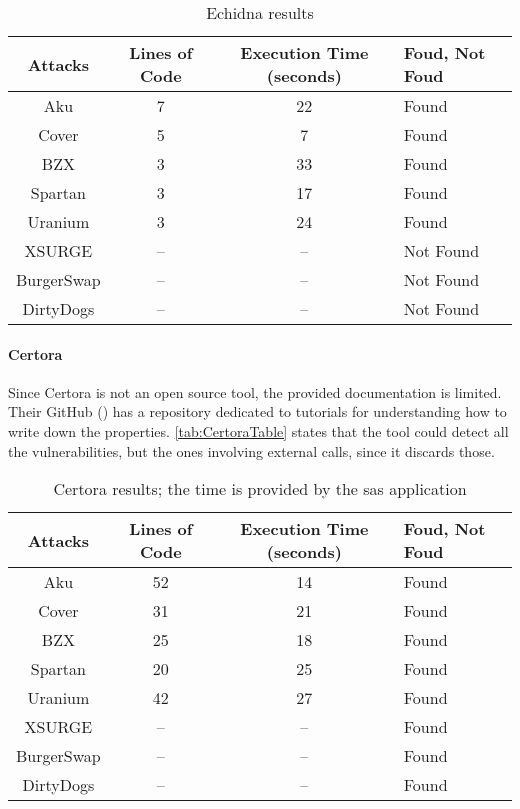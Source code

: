 \begin{center}
    \begin{table*}    
        \caption{Echidna results}
        \label{tab:EchidnaTable}
        \begin{tabular}{cccl}
        \toprule
            Attacks & Lines of Code & Execution Time (seconds) & Foud, Not Foud\\
            \midrule
            Aku & 7 & 22 & Found\\ 
            Cover & 5 & 7 & Found\\ 
            BZX & 3 & 33 & Found \\ 
            Spartan & 3 & 17 & Found  \\ 
            Uranium & 3 & 24 & Found \\ 
            XSURGE & -- & -- & Not Found \\  
            BurgerSwap &  -- & -- & Not Found \\ 
            DirtyDogs &  -- & -- & Not Found \\
        \bottomrule
        \end{tabular}
    \end{table*}
\end{center}

\paragraph{Certora} Since Certora is not an open source tool, the provided documentation is limited. 
Their GitHub (\cite{CertoraGitHub}) has a repository dedicated to tutorials for understanding how to write down the properties. 
\autoref{tab:CertoraTable} states that the tool could detect all the vulnerabilities, 
but the ones involving external calls, since it discards those.

\begin{center}
    \begin{table*}
        \caption{Certora results; the time is provided by the sas application}
            \label{tab:CertoraTable}
            \begin{tabular}{cccl}
            \toprule
                Attacks & Lines of Code & Execution Time (seconds) & Foud, Not Foud\\
                \midrule
                Aku & 52 & 14 & Found \\ 
                Cover & 31 & 21 & Found\\ 
                BZX & 25  & 18 & Found\\ 
                Spartan & 20  & 25 & Found\\ 
                Uranium & 42 & 27  & Found\\ 
                XSURGE &  -- & -- & Found\\  
                BurgerSwap &  -- & --& Found\\ 
                DirtyDogs &  -- & -- & Found\\
            \bottomrule
            \end{tabular}
    \end{table*}
\end{center}


